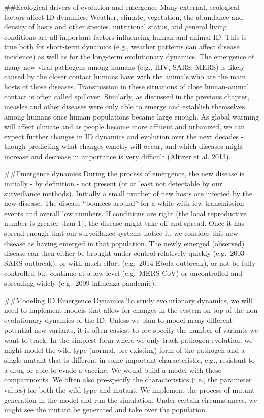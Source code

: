 \documentclass[]{book}
\theoremstyle{definition}
\theoremstyle{definition}
\theoremstyle{definition}
\theoremstyle{remark}
\begin{document}
\#\#Ecological drivers of evolution and emergence Many external,
ecological factors affect ID dynamics. Weather, climate, vegetation, the
abundance and density of hosts and other species, nutritional status,
and general living conditions are all important factors influencing
human and animal ID. This is true both for short-term dynamics (e.g.,
weather patterns can affect disease incidence) as well as for the
long-term evolutionary dynamics. The emergence of many new viral
pathogens among humans (e.g., HIV, SARS, MERS) is likely caused by the
closer contact humans have with the animals who are the main hosts of
those diseases. Transmission in these situations of close human-animal
contact is often called spillover. Similarly, as discussed in the
previous chapter, measles and other diseases were only able to emerge
and establish themselves among humans once human populations became
large enough. As global warming will affect climate and as people become
more affluent and urbanized, we can expect further changes in ID
dynamics and evolution over the next decades - though predicting what
changes exactly will occur, and which diseases might increase and
decrease in importance is very difficult (Altizer et al.
\protect\hyperlink{ref-altizer13}{2013}).

\#\#Emergence dynamics During the process of emergence, the new disease
is initially - by definition - not present (or at least not detectable
by our surveillance methods). Initially a small number of new hosts are
infected by the new disease. The disease ``bounces around'' for a while
with few transmission events and overall low numbers. If conditions are
right (the local reproductive number is greater than 1), the disease
might take off and spread. Once it has spread enough that our
surveillance systems notice it, we consider this new disease as having
emerged in that population. The newly emerged (observed) disease can
then either be brought under control relatively quickly (e.g.~2003 SARS
outbreak), or with much effort (e.g.~2014 Ebola outbreak), or not be
fully controlled but continue at a low level (e.g.~MERS-CoV) or
uncontrolled and spreading widely (e.g.~2009 influenza pandemic).

\#\#Modeling ID Emergence Dynamics To study evolutionary dynamics, we
will need to implement models that allow for changes in the system on
top of the non-evolutionary dynamics of the ID. Unless we plan to model
many different potential new variants, it is often easiest to
pre-specify the number of variants we want to track. In the simplest
form where we only track pathogen evolution, we might model the
wild-type (normal, pre-existing) form of the pathogen and a single
mutant that is different in some important characteristic, e.g.,
resistant to a drug or able to evade a vaccine. We would build a model
with these compartments. We often also pre-specify the characteristics
(i.e., the parameter values) for both the wild-type and mutant. We
implement the process of mutant generation in the model and run the
simulation. Under certain circumstances, we might see the mutant be
generated and take over the population.
\end{document}
